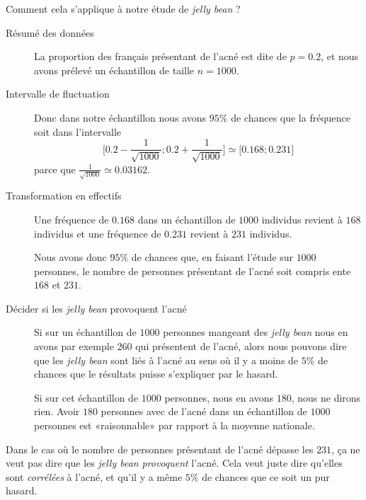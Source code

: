Comment cela s'applique à notre étude de \emph{jelly bean} ? 
\begin{description}
    \item[Résumé des données]
        La proportion des français présentant de l'acné est dite de \( p=0.2\), et nous avons prélevé un échantillon de taille \( n=1000\). 
    \item[Intervalle de fluctuation] 
        Donc dans notre échantillon nous avons \( 95\%\) de chances que la fréquence soit dans l'intervalle
        \begin{equation}
            \mathopen[ 0.2-\frac{1}{ \sqrt{1000} } ; 0.2+\frac{1}{ \sqrt{1000} } \mathclose]\simeq\mathopen[ 0.168 ; 0.231 \mathclose]
        \end{equation}
        parce que \( \frac{1}{ \sqrt{1000} }\simeq 0.03162\).
    \item[Transformation en effectifs]

        Une fréquence de \( 0.168\) dans un échantillon de \( 1000\) individus revient à \( 168\) individus et une fréquence de \( 0.231\) revient à \( 231\) individus.

        Nous avons donc \( 95\%\) de chances que, en faisant l'étude sur \( 1000\) personnes, le nombre de personnes présentant de l'acné soit compris ente \( 168\) et \( 231\).
    \item[Décider si les \emph{jelly bean} provoquent l'acné]
        Si sur un échantillon de \( 1000\) personnes mangeant des \emph{jelly bean} nous en avons par exemple \( 260\) qui présentent de l'acné, alors nous pouvons dire que les \emph{jelly bean} sont liés à l'acné au sens où il y a moins de \( 5\%\) de chances que le résultats puisse s'expliquer par le hasard.

        Si sur cet échantillon de \( 1000\) personnes, nous en avons \( 180\), nous ne dirons rien. Avoir \( 180\) personnes avec de l'acné dans un échantillon de \( 1000\) personnes est «raisonnable» par rapport à la moyenne nationale.
\end{description}

\begin{remark}
    Dans le cas où le nombre de personnes présentant de l'acné dépasse les \( 231\), ça ne veut pas dire que les \emph{jelly bean} \emph{provoquent} l'acné. Cela veut juste dire qu'elles sont \emph{corrélées} à l'acné, et qu'il y a même \( 5\%\) de chances que ce soit un pur hasard.
\end{remark}



